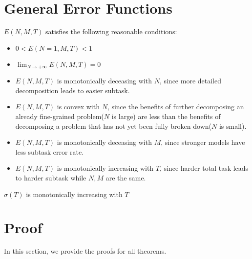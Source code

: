 \section{General Error Functions}
\label{app:assumption}
\begin{assumption}
     $E(N,M,T)$ satisfies the following reasonable conditions:
\begin{itemize}
\label{ass:error_e}
    \item $0 < E(N=1,M,T) < 1$
    \item $\lim_{N \rightarrow +\infty}E(N,M,T) = 0$
    \item $E(N,M,T)$ is monotonically deceasing with $N$, since more detailed decomposition leads to easier subtask.
    \item $E(N,M,T)$ is convex with $N$, since the benefits of further decomposing an already fine-grained problem($N$ is large) are less than the benefits of decomposing a problem that has not yet been fully broken down($N$ is small).
    \item $E(N,M,T)$ is monotonically deceasing with $M$, since stronger models have less subtask error rate.
    \item $E(N,M,T)$ is monotonically increasing with $T$, since harder total task leads to harder subtask while $N,M$ are the same.
\end{itemize}
\end{assumption}

\begin{assumption}
\label{ass:error_sigma}
     $\sigma(T)$ is monotonically increasing with $T$
\end{assumption}

\section{Proof}
\label{app:proof}
In this section, we provide the proofs for all theorems.

